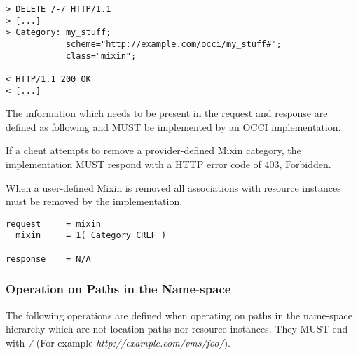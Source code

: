 \documentclass[10pt,a4paper]{article}
\begin{document}
\begin{description}
\begin{verbatim}
> DELETE /-/ HTTP/1.1
> [...]
> Category: my_stuff; 
            scheme="http://example.com/occi/my_stuff#"; 
            class="mixin";

< HTTP/1.1 200 OK
< [...]
\end{verbatim}

    The information which needs to be present in the request and
    response are defined as following and MUST be implemented by an
    OCCI implementation.
    
    If a client attempts to remove a provider-defined Mixin category,
    the implementation MUST respond with a HTTP error code of 403,
    Forbidden.
    
    When a user-defined Mixin is removed all associations with
    resource instances must be removed by the implementation.

\begin{verbatim}
request     = mixin
  mixin     = 1( Category CRLF )

response    = N/A
\end{verbatim}

\end{description}

\subsubsection{Operation on Paths in the Name-space}

The following operations are defined when operating on paths in the
name-space hierarchy which are not location paths nor resource
instances. They MUST end with \emph{/} (For example
\emph{http://example.com/vms/foo/}).
\end{document}

